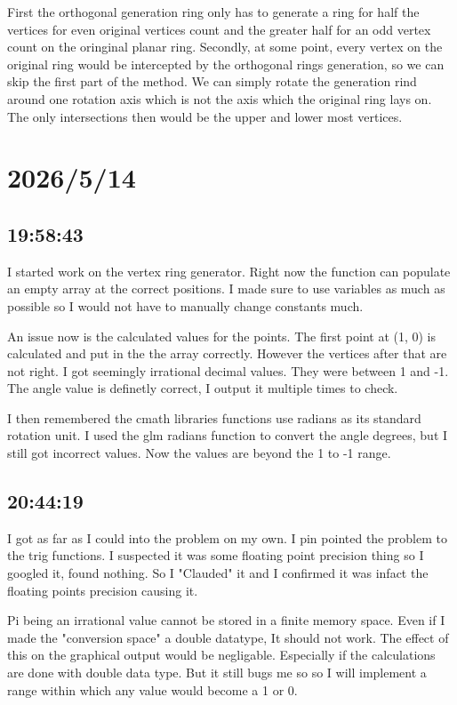 \documentclass{article}
\begin{document}
First the orthogonal generation ring only has to generate a ring for half the vertices for even original
vertices count and the greater half for an odd vertex count on the oringinal planar ring. Secondly, at 
some point, every  vertex on the original ring would be intercepted by the orthogonal rings generation, so
we can skip the first part of the method. We can simply rotate the generation rind around one rotation axis
which is not the axis which the original ring lays on. The only intersections then would be the upper and 
lower most vertices.

\section*{2026/5/14}
\subsection*{19:58:43}
I started work on the vertex ring generator. Right now the function can populate an empty array at the correct
positions. I made sure to use variables as much as possible so I would not have to manually change constants 
much.

An issue now is the calculated values for the points. The first point at (1, 0) is calculated and put in the
the array correctly. However the vertices after that are not right. I got seemingly irrational decimal values.
They were between 1 and -1. The angle value is definetly correct, I output it multiple times to check. 

I then remembered the cmath libraries functions use radians as its standard rotation unit. I used the glm
radians function to convert the angle degrees, but I still got incorrect values. Now the values are beyond 
the 1 to -1 range.

\subsection*{20:44:19}
I got as far as I could into the problem on my own. I pin pointed the problem to the trig functions. I 
suspected it was some floating point precision thing so I googled it, found nothing. So I "Clauded" it
and I confirmed it was infact the floating points precision causing it. 

Pi being an irrational value cannot be stored in a finite memory space. Even if I made the "conversion
space" a double datatype, It should not work. The effect of this on the graphical output would be
negligable. Especially if the calculations are done with double data type. But it still bugs me so
so I will implement a range within which any value would become a 1 or 0.
\end{document}
